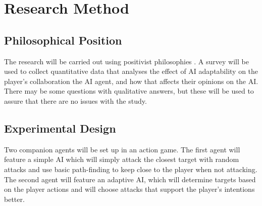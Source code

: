 \documentclass{IEEEtran}
\begin{document}
\section{Research Method}
\label{ResearchMethod}

\subsection{Philosophical Position}
\label{PhilosophicalPosition}



The research will be carried out using positivist philosophies \cite{Zukauskas18}. A survey will be used to collect quantitative data that analyses the effect of AI adaptability on the player's collaboration the AI agent, and how that affects their opinions on the AI. There may be some questions with qualitative answers, but these will be used to assure that there are no issues with the study.

\subsection{Experimental Design}
\label{ExperimentalDesign}



Two companion agents will be set up in an action game. The first agent will feature a simple AI which will simply attack the closest target with random attacks and use basic path-finding to keep close to the player when not attacking. The second agent will feature an adaptive AI, which will determine targets based on the player actions and will choose attacks that support the player's intentions better.
\end{document}
